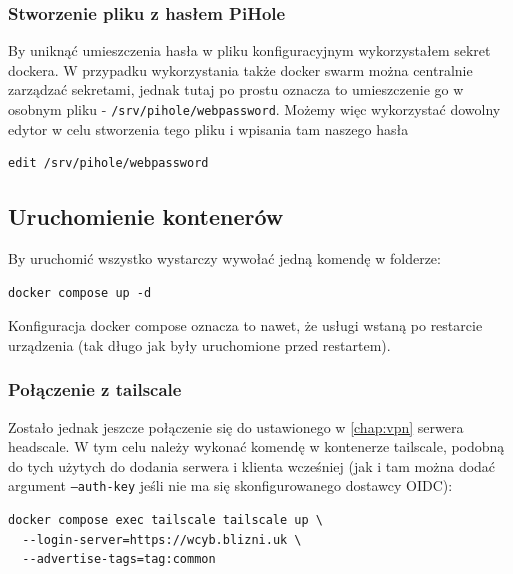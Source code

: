 \documentclass[../main.tex]{subfiles}
\begin{document}
\subsubsection{Stworzenie pliku z hasłem PiHole}
By uniknąć umieszczenia hasła w pliku konfiguracyjnym wykorzystałem sekret dockera. W przypadku wykorzystania także docker swarm można centralnie zarządzać sekretami, jednak tutaj po prostu oznacza to umieszczenie go w osobnym pliku - \texttt{/srv/pihole/webpassword}. Możemy więc wykorzystać dowolny edytor w celu stworzenia tego pliku i wpisania tam naszego hasła
\begin{verbatim}
edit /srv/pihole/webpassword
\end{verbatim}

\subsection{Uruchomienie kontenerów}
By uruchomić wszystko wystarczy wywołać jedną komendę w folderze:
\begin{verbatim}
docker compose up -d
\end{verbatim}
Konfiguracja docker compose oznacza to nawet, że usługi wstaną po restarcie urządzenia (tak długo jak były uruchomione przed restartem).
\subsubsection{Połączenie z tailscale}
Zostało jednak jeszcze połączenie się do ustawionego w \autoref{chap:vpn} serwera headscale. W tym celu należy wykonać komendę w kontenerze tailscale, podobną do tych użytych do dodania serwera i klienta wcześniej (jak i tam można dodać argument \texttt{--auth-key} jeśli nie ma się skonfigurowanego dostawcy OIDC):
\begin{verbatim}    
docker compose exec tailscale tailscale up \
  --login-server=https://wcyb.blizni.uk \
  --advertise-tags=tag:common
\end{verbatim}
\end{document}
